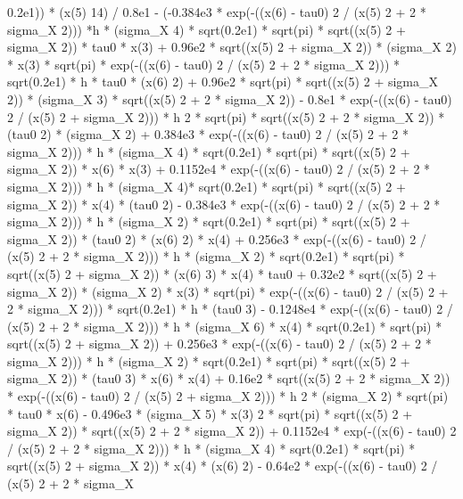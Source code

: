 \begin{maplegroup}
0.2e1)) * (x(5)  14) / 0.8e1 - (-0.384e3 * exp(-((x(6) - tau0)  2 / (x(5)  2 + 2 * sigma\_X  2))) *h * (sigma\_X  4) * sqrt(0.2e1) * sqrt(pi) * sqrt((x(5)  2 + sigma\_X  2)) * tau0 * x(3) + 0.96e2 * sqrt((x(5)  2 + sigma\_X  2)) * (sigma\_X  2) * x(3) * sqrt(pi) * exp(-((x(6) - tau0)  2 / (x(5)  2 + 2 * sigma\_X  2))) * sqrt(0.2e1) * h * tau0 * (x(6)  2) + 0.96e2 * sqrt(pi) * sqrt((x(5)  2 + sigma\_X  2)) * (sigma\_X  3) * sqrt((x(5)  2 + 2 * sigma\_X  2)) - 0.8e1 * exp(-((x(6) - tau0)  2 / (x(5)  2 + sigma\_X  2))) * h  2 * sqrt(pi) * sqrt((x(5)  2 + 2 * sigma\_X  2)) * (tau0  2) * (sigma\_X 2) + 0.384e3 * exp(-((x(6) - tau0)  2 / (x(5)  2 + 2 * sigma\_X  2))) * h * (sigma\_X  4) * sqrt(0.2e1) * sqrt(pi) * sqrt((x(5)  2 + sigma\_X  2)) * x(6) * x(3) + 0.1152e4 * exp(-((x(6) - tau0)  2 / (x(5)  2 + 2 * sigma\_X  2))) * h * (sigma\_X  4)* sqrt(0.2e1) * sqrt(pi) * sqrt((x(5)  2 + sigma\_X  2)) * x(4) * (tau0  2) - 0.384e3 * exp(-((x(6) - tau0)  2 / (x(5)  2 + 2 * sigma\_X  2))) * h * (sigma\_X  2) * sqrt(0.2e1) * sqrt(pi) * sqrt((x(5)  2 + sigma\_X  2)) * (tau0  2) * (x(6)  2) * x(4) + 0.256e3 * exp(-((x(6) - tau0)  2 / (x(5)  2 + 2 * sigma\_X  2))) * h * (sigma\_X  2) * sqrt(0.2e1) * sqrt(pi) * sqrt((x(5)  2 + sigma\_X  2)) * (x(6)  3) * x(4) * tau0 + 0.32e2 * sqrt((x(5)  2 + sigma\_X  2)) * (sigma\_X  2) * x(3) * sqrt(pi) * exp(-((x(6) - tau0)  2 / (x(5)  2 + 2 * sigma\_X  2))) * sqrt(0.2e1) * h * (tau0  3) - 0.1248e4 * exp(-((x(6) - tau0)  2 / (x(5)  2 + 2 * sigma\_X  2))) * h * (sigma\_X  6) * x(4) * sqrt(0.2e1) * sqrt(pi) * sqrt((x(5)  2 + sigma\_X  2)) + 0.256e3 * exp(-((x(6) - tau0)  2 / (x(5)  2 + 2 * sigma\_X  2))) * h * (sigma\_X  2) * sqrt(0.2e1) * sqrt(pi) * sqrt((x(5)  2 + sigma\_X  2)) * (tau0  3) * x(6) * x(4) + 0.16e2 * sqrt((x(5)  2 + 2 * sigma\_X  2)) * exp(-((x(6) - tau0)  2 / (x(5)  2 + sigma\_X  2))) * h  2 * (sigma\_X  2) * sqrt(pi) * tau0 * x(6) - 0.496e3 * (sigma\_X  5) * x(3)  2 * sqrt(pi) * sqrt((x(5)  2 + sigma\_X  2)) * sqrt((x(5)  2 + 2 * sigma\_X  2)) + 0.1152e4 * exp(-((x(6) - tau0)  2 / (x(5)  2 + 2 * sigma\_X  2))) * h * (sigma\_X 4) * sqrt(0.2e1) * sqrt(pi) * sqrt((x(5)  2 + sigma\_X  2)) * x(4) * (x(6)  2) - 0.64e2 * exp(-((x(6) - tau0)  2 / (x(5)  2 + 2 * sigma\_X  
\end{maplegroup}
